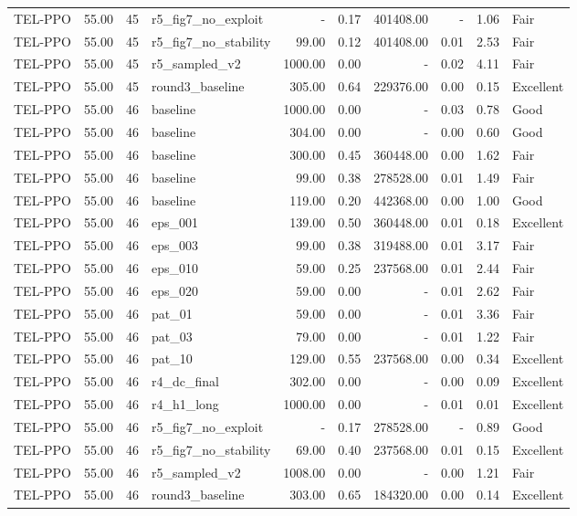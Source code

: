 \begin{table}[htbp]
\begin{tabular}{lrrlrrrrrl}
TEL-PPO & 55.00 & 45 & r5_fig7_no_exploit & - & 0.17 & 401408.00 & - & 1.06 & Fair \\
TEL-PPO & 55.00 & 45 & r5_fig7_no_stability & 99.00 & 0.12 & 401408.00 & 0.01 & 2.53 & Fair \\
TEL-PPO & 55.00 & 45 & r5_sampled_v2 & 1000.00 & 0.00 & - & 0.02 & 4.11 & Fair \\
TEL-PPO & 55.00 & 45 & round3_baseline & 305.00 & 0.64 & 229376.00 & 0.00 & 0.15 & Excellent \\
TEL-PPO & 55.00 & 46 & baseline & 1000.00 & 0.00 & - & 0.03 & 0.78 & Good \\
TEL-PPO & 55.00 & 46 & baseline & 304.00 & 0.00 & - & 0.00 & 0.60 & Good \\
TEL-PPO & 55.00 & 46 & baseline & 300.00 & 0.45 & 360448.00 & 0.00 & 1.62 & Fair \\
TEL-PPO & 55.00 & 46 & baseline & 99.00 & 0.38 & 278528.00 & 0.01 & 1.49 & Fair \\
TEL-PPO & 55.00 & 46 & baseline & 119.00 & 0.20 & 442368.00 & 0.00 & 1.00 & Good \\
TEL-PPO & 55.00 & 46 & eps_001 & 139.00 & 0.50 & 360448.00 & 0.01 & 0.18 & Excellent \\
TEL-PPO & 55.00 & 46 & eps_003 & 99.00 & 0.38 & 319488.00 & 0.01 & 3.17 & Fair \\
TEL-PPO & 55.00 & 46 & eps_010 & 59.00 & 0.25 & 237568.00 & 0.01 & 2.44 & Fair \\
TEL-PPO & 55.00 & 46 & eps_020 & 59.00 & 0.00 & - & 0.01 & 2.62 & Fair \\
TEL-PPO & 55.00 & 46 & pat_01 & 59.00 & 0.00 & - & 0.01 & 3.36 & Fair \\
TEL-PPO & 55.00 & 46 & pat_03 & 79.00 & 0.00 & - & 0.01 & 1.22 & Fair \\
TEL-PPO & 55.00 & 46 & pat_10 & 129.00 & 0.55 & 237568.00 & 0.00 & 0.34 & Excellent \\
TEL-PPO & 55.00 & 46 & r4_dc_final & 302.00 & 0.00 & - & 0.00 & 0.09 & Excellent \\
TEL-PPO & 55.00 & 46 & r4_h1_long & 1000.00 & 0.00 & - & 0.01 & 0.01 & Excellent \\
TEL-PPO & 55.00 & 46 & r5_fig7_no_exploit & - & 0.17 & 278528.00 & - & 0.89 & Good \\
TEL-PPO & 55.00 & 46 & r5_fig7_no_stability & 69.00 & 0.40 & 237568.00 & 0.01 & 0.15 & Excellent \\
TEL-PPO & 55.00 & 46 & r5_sampled_v2 & 1008.00 & 0.00 & - & 0.00 & 1.21 & Fair \\
TEL-PPO & 55.00 & 46 & round3_baseline & 303.00 & 0.65 & 184320.00 & 0.00 & 0.14 & Excellent \\
\bottomrule
\end{tabular}

\end{table}
